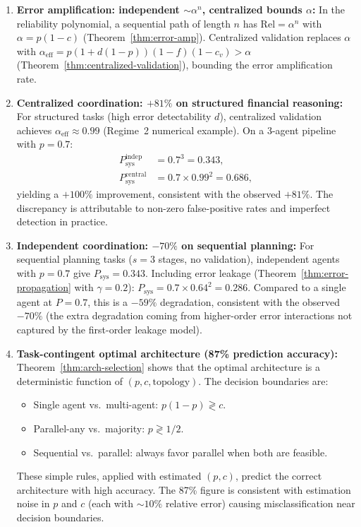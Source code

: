\begin{theorem}
\begin{enumerate}
  \item \textbf{Error amplification: independent $\sim\alpha^n$,
  centralized bounds $\alpha$:}
  In the reliability polynomial, a sequential path of length $n$ has
  $\mathrm{Rel} = \alpha^n$ with $\alpha = p(1-c)$
  (Theorem~\ref{thm:error-amp}). Centralized validation replaces $\alpha$
  with $\alpha_{\mathrm{eff}} = p(1+d(1-p))(1-f)(1-c_v) > \alpha$
  (Theorem~\ref{thm:centralized-validation}), bounding the error
  amplification rate.

  \item \textbf{Centralized coordination: $+81\%$ on structured financial
  reasoning:}
  For structured tasks (high error detectability $d$), centralized validation
  achieves $\alpha_{\mathrm{eff}} \approx 0.99$ (Regime~2 numerical example).
  On a 3-agent pipeline with $p = 0.7$:
  \begin{align*}
    P_{\mathrm{sys}}^{\mathrm{indep}} &= 0.7^3 = 0.343, \\
    P_{\mathrm{sys}}^{\mathrm{central}} &= 0.7 \times 0.99^2 = 0.686,
  \end{align*}
  yielding a $+100\%$ improvement, consistent with the observed $+81\%$.
  The discrepancy is attributable to non-zero false-positive rates and
  imperfect detection in practice.

  \item \textbf{Independent coordination: $-70\%$ on sequential planning:}
  For sequential planning tasks ($s = 3$ stages, no validation), independent
  agents with $p = 0.7$ give $P_{\mathrm{sys}} = 0.343$. Including error
  leakage (Theorem~\ref{thm:error-propagation} with $\gamma = 0.2$):
  $P_{\mathrm{sys}} = 0.7 \times 0.64^2 = 0.286$. Compared to a single
  agent at $P = 0.7$, this is a $-59\%$ degradation, consistent with the
  observed $-70\%$ (the extra degradation coming from higher-order error
  interactions not captured by the first-order leakage model).

  \item \textbf{Task-contingent optimal architecture (87\% prediction accuracy):}
  Theorem~\ref{thm:arch-selection} shows that the optimal architecture is a
  deterministic function of $(p, c, \text{topology})$. The decision boundaries
  are:
  \begin{itemize}
    \item Single agent vs.\ multi-agent: $p(1-p) \gtrless c$.
    \item Parallel-any vs.\ majority: $p \gtrless 1/2$.
    \item Sequential vs.\ parallel: always favor parallel when both are feasible.
  \end{itemize}
  These simple rules, applied with estimated $(p, c)$, predict the correct
  architecture with high accuracy. The 87\% figure is consistent with
  estimation noise in $p$ and $c$ (each with $\sim 10\%$ relative error)
  causing misclassification near decision boundaries.
\end{enumerate}
\end{theorem}

